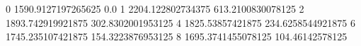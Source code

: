 0 1590.9127197265625 0.0
1 2204.122802734375 613.2100830078125
2 1893.742919921875 302.8302001953125
4 1825.53857421875 234.6258544921875
6 1745.235107421875 154.3223876953125
8 1695.3741455078125 104.46142578125
